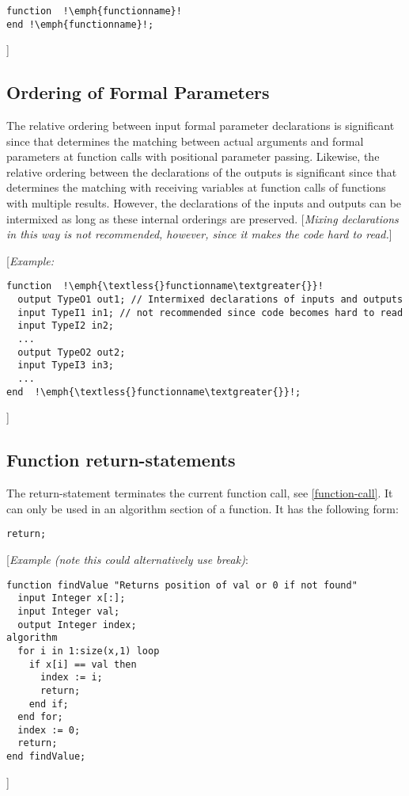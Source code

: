 \begin{lstlisting}[language=modelica,escapechar=!]
function  !\emph{functionname}!
end !\emph{functionname}!;
\end{lstlisting}
{]}

\subsection{Ordering of Formal Parameters}

The relative ordering between input formal parameter declarations is
significant since that determines the matching between actual arguments
and formal parameters at function calls with positional parameter
passing. Likewise, the relative ordering between the declarations of the
outputs is significant since that determines the matching with receiving
variables at function calls of functions with multiple results. However,
the declarations of the inputs and outputs can be intermixed as long as
these internal orderings are preserved. {[}\emph{Mixing declarations in
this way is not recommended, however, since it makes the code hard to
read.}{]}

{[}\emph{Example:}

\begin{lstlisting}[language=modelica,escapechar=!]
function  !\emph{\textless{}functionname\textgreater{}}!
  output TypeO1 out1; // Intermixed declarations of inputs and outputs
  input TypeI1 in1; // not recommended since code becomes hard to read
  input TypeI2 in2;
  ...
  output TypeO2 out2;
  input TypeI3 in3;
  ...
end  !\emph{\textless{}functionname\textgreater{}}!;
\end{lstlisting}

{]}

\subsection{Function return-statements}

The return-statement terminates the current function call, see \autoref{function-call}.
It can only be used in an algorithm section of a function. It has
the following form:
\begin{lstlisting}[language=modelica]
return;
\end{lstlisting}

{[}\emph{Example (note this could alternatively use break)}:

\begin{lstlisting}[language=modelica]
function findValue "Returns position of val or 0 if not found"
  input Integer x[:];
  input Integer val;
  output Integer index;
algorithm
  for i in 1:size(x,1) loop
    if x[i] == val then
      index := i;
      return;
    end if;
  end for;
  index := 0;
  return;
end findValue;
\end{lstlisting}
{]}

